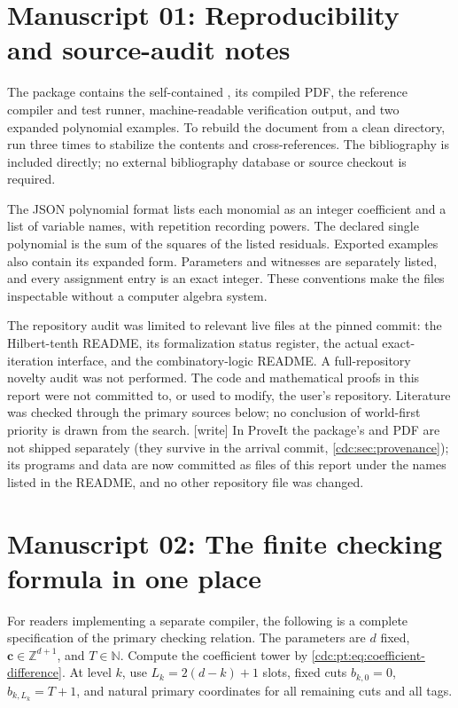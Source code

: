 \documentclass[11pt,a4paper]{article}
\theoremstyle{definition}
\theoremstyle{remark}
\newcommand{\N}{\mathbb N}
\newcommand{\Z}{\mathbb Z}
\newcommand{\code}[1]{\texttt{\detokenize{#1}}}
\newcommand{\wtag}{\textup{[write]}}%
\begin{document}
\section{Manuscript 01: Reproducibility and source-audit notes}\label{cdc:ct:app:repro}
The package contains the self-contained \code{article.tex}, its compiled PDF, the reference compiler and test runner, machine-readable verification output, and two expanded polynomial examples. To rebuild the document from a clean directory, run \code{pdflatex article.tex} three times to stabilize the contents and cross-references. The bibliography is included directly; no external bibliography database or source checkout is required.

The JSON polynomial format lists each monomial as an integer coefficient and a list of variable names, with repetition recording powers. The declared single polynomial is the sum of the squares of the listed residuals. Exported examples also contain its expanded form. Parameters and witnesses are separately listed, and every assignment entry is an exact integer. These conventions make the files inspectable without a computer algebra system.

The repository audit was limited to relevant live files at the pinned commit: the Hilbert-tenth README, its formalization status register, the actual exact-iteration interface, and the combinatory-logic README. A full-repository novelty audit was not performed. The code and mathematical proofs in this report were not committed to, or used to modify, the user's repository. Literature was checked through the primary sources below; no conclusion of world-first priority is drawn from the search. \wtag{} In ProveIt the package's \code{article.tex} and PDF are not shipped separately (they survive in the arrival commit, \cref{cdc:sec:provenance}); its programs and data are now committed as files of this report under the names listed in the README, and no other repository file was changed.


\section{Manuscript 02: The finite checking formula in one place}
\label{cdc:pt:app:formula}
For readers implementing a separate compiler, the following is a complete
specification of the primary checking relation. The parameters are
$d$ fixed, $\boldsymbol c\in\Z^{d+1}$, and $T\in\N$. Compute the
coefficient tower by \eqref{cdc:pt:eq:coefficient-difference}. At level $k$, use
$L_k=2(d-k)+1$ slots, fixed cuts $b_{k,0}=0$,
$b_{k,L_k}=T+1$, and natural primary coordinates for all remaining cuts
and all tags.
\end{document}
